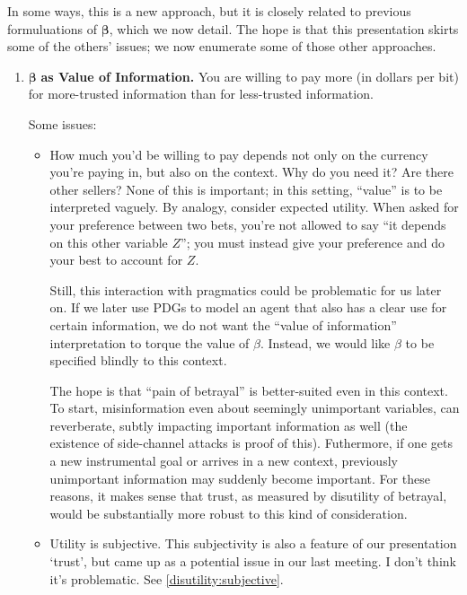 \documentclass[twoside]{article} %
\theoremstyle{plain}
\theoremstyle{definition}
\newcommand{\bbeta}{\boldsymbol\beta}
\begin{document}
    In some ways, this is a new approach, but it is closely related to previous formuluations of $\bbeta$, which we now detail.
    The hope is that this presentation skirts some of the others' issues; we now enumerate some of those other approaches.
    \smallskip
    \begin{enumerate}
        \item $\bbeta$ \textbf{as Value of Information.} You are willing to pay more (in dollars per bit) for more-trusted information than for less-trusted information.

        Some issues:
        \begin{itemize}
            \item How much you'd be willing to pay depends not only on the currency you're paying in, but also on the context. Why do you need it? Are there other sellers?
              None of this is important; in this setting, ``value'' is to be interpreted vaguely.
              By analogy, consider expected utility. When asked for your preference between two bets, you're not allowed to say ``it depends on this other variable $Z$''; you must instead give your preference and do your best to account for $Z$.

            Still, this interaction with pragmatics could be problematic for us later on. If we later use PDGs to model an agent that also has a clear use for certain information, we do not want the ``value of information'' interpretation to torque the value of $\beta$. Instead, we would like $\beta$ to be specified blindly to this context.

            The hope is that ``pain of betrayal'' is better-suited even in this context.
            To start, misinformation even about seemingly unimportant variables, can reverberate, subtly impacting important information as well (the existence of side-channel attacks is proof of this).
            Futhermore, if one gets a new instrumental goal or arrives in a new context, previously unimportant information may suddenly become important.
            For these reasons, it makes sense that trust, as measured by disutility of betrayal, would be substantially more robust to this kind of consideration.

            \item Utility is subjective. This subjectivity is also a feature of our presentation `trust', but came up as a potential issue in our last meeting.
            I don't think it's problematic. See \cref{disutility:subjective}.
        \end{itemize}


\end{enumerate}
\end{document}
